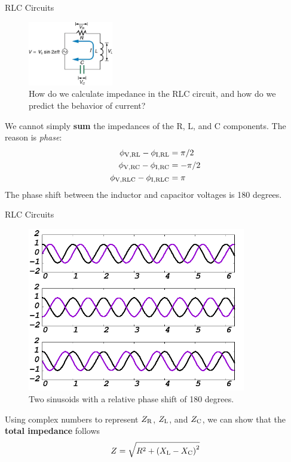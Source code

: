 \documentclass{beamer}
\begin{document}
\begin{frame}{RLC Circuits}
\footnotesize
\begin{figure}
\centering
\includegraphics[width=0.33\textwidth]{figures/phase5.png}
\caption{\label{fig:phase7} How do we calculate impedance in the RLC circuit, and how do we predict the behavior of current?}
\end{figure}
We cannot simply \textbf{\alert{sum}} the impedances of the R, L, and C components.  The reason is \textit{phase}:
\begin{align}
\phi_{\rm V,RL} - \phi_{\rm I,RL} &= \pi/2 \\
\phi_{\rm V,RC} - \phi_{\rm I,RC} &= -\pi/2 \\
\phi_{\rm V,RLC} - \phi_{\rm I,RLC} &= \pi
\end{align}
The phase shift between the inductor and capacitor voltages is 180 degrees.
\end{frame}

\begin{frame}{RLC Circuits}
\begin{figure}
\centering
\includegraphics[width=0.85\textwidth,trim=1cm 5cm 0cm 4cm,clip=true]{figures/phase2.png}
\caption{\label{fig:phase8} Two sinusoids with a relative phase shift of 180 degrees.}
\end{figure}
Using complex numbers to represent $Z_{\rm R}$, $Z_{\rm L}$, and $Z_{\rm C}$, we can show that the \textbf{\alert{total impedance}} follows
\begin{equation}
Z = \sqrt{R^2 + \left(X_{\rm L} - X_{\rm C} \right)^2}
\end{equation}
\end{frame}
\end{document}
